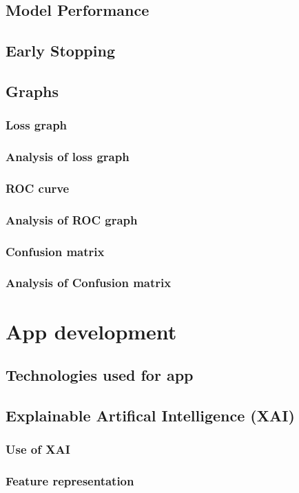 \documentclass[a4paper,oneside,11pt]{book}
\begin{document}
\section{Model Performance}
\section{Early Stopping}
\section{Graphs}
\subsection{Loss graph}
\subsection{Analysis of loss graph}
\subsection{ROC curve}
\subsection{Analysis of ROC graph}
\subsection{Confusion matrix}
\subsection{Analysis of Confusion matrix}

\chapter{App development}
\section{Technologies used for app}
\section{Explainable Artifical Intelligence (XAI)}
\subsection{Use of XAI}
\subsection{Feature representation}
\end{document}

